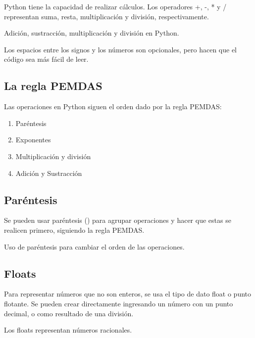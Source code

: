 \documentclass{article}
\begin{document}
Python tiene la capacidad de realizar cálculos. Los operadores +, -, * y / representan suma, resta, multiplicación y división, respectivamente.

\begin{listing*}[ht!]
  \caption{Adición, sustracción, multiplicación y división en Python.}
\end{listing*}

Los espacios entre los signos y los números son opcionales, pero hacen que el código sea más fácil de leer.

\subsection{La regla PEMDAS}

Las operaciones en Python siguen el orden dado por la regla PEMDAS:

\begin{enumerate}
  \item Paréntesis
  \item Exponentes
  \item Multiplicación y división
  \item Adición y Sustracción
\end{enumerate}


\subsection{Paréntesis}

Se pueden usar paréntesis () para agrupar operaciones y hacer que estas se realicen primero, siguiendo la regla PEMDAS.

\begin{listing*}[ht!]
  \caption{Uso de paréntesis para cambiar el orden de las operaciones.}
\end{listing*}

\subsection{Floats}
    
Para representar números que no son enteros, se usa el tipo de dato float o punto flotante. Se pueden crear directamente ingresando un número con un punto decimal, o como resultado de una división.

\begin{listing*}[ht!]
  \caption{Los floats representan números racionales.}
\end{listing*}
\end{document}
